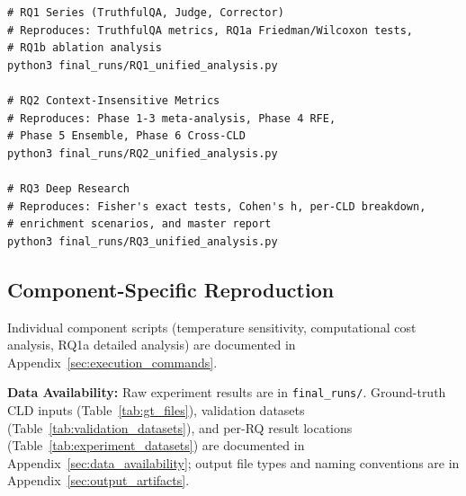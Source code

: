 \begin{verbatim}
# RQ1 Series (TruthfulQA, Judge, Corrector)
# Reproduces: TruthfulQA metrics, RQ1a Friedman/Wilcoxon tests,
# RQ1b ablation analysis
python3 final_runs/RQ1_unified_analysis.py

# RQ2 Context-Insensitive Metrics
# Reproduces: Phase 1-3 meta-analysis, Phase 4 RFE,
# Phase 5 Ensemble, Phase 6 Cross-CLD
python3 final_runs/RQ2_unified_analysis.py

# RQ3 Deep Research
# Reproduces: Fisher's exact tests, Cohen's h, per-CLD breakdown,
# enrichment scenarios, and master report
python3 final_runs/RQ3_unified_analysis.py
\end{verbatim}

\subsection{Component-Specific Reproduction}

Individual component scripts (temperature sensitivity, computational cost analysis, RQ1a detailed analysis) are documented in Appendix~\ref{sec:execution_commands}.

\textbf{Data Availability:} Raw experiment results are in \texttt{final\_runs/}. Ground-truth CLD inputs (Table~\ref{tab:gt_files}), validation datasets (Table~\ref{tab:validation_datasets}), and per-RQ result locations (Table~\ref{tab:experiment_datasets}) are documented in Appendix~\ref{sec:data_availability}; output file types and naming conventions are in Appendix~\ref{sec:output_artifacts}.